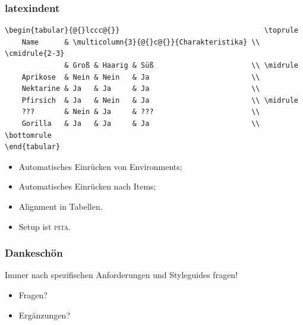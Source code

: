 \documentclass[handout]{beamer}
\makeatletter
\def\beamer@writeslidentry@miniframesoff{%
    \expandafter\beamer@ifempty\expandafter{\beamer@framestartpage}{}%
    {%
        \clearpage\beamer@notesactions%
    }
}
\newcommand*{\miniframesoff}{\let\beamer@writeslidentry=\beamer@writeslidentry@miniframesoff}
\makeatother
\begin{document}
\begin{frame}[fragile]
    \frametitle{latexindent}
    \begin{lstlisting}[basicstyle=\ttfamily\scriptsize]
\begin{tabular}{@{}lccc@{}}                                  \toprule
    Name      & \multicolumn{3}{@{}c@{}}{Charakteristika} \\ \cmidrule{2-3}
              & Groß & Haarig & Süß                       \\ \midrule
    Aprikose  & Nein & Nein   & Ja                        \\
    Nektarine & Ja   & Ja     & Ja                        \\
    Pfirsich  & Ja   & Nein   & Ja                        \\ \midrule
    ???       & Nein & Ja     & ???                       \\
    Gorilla   & Ja   & Ja     & Ja                        \\ \bottomrule
\end{tabular}
    \end{lstlisting}
    \begin{itemize}
        \item Automatisches Einrücken von Environments;
        \item Automatisches Einrücken nach Items;
        \item Alignment in Tabellen.
        \item Setup ist \textsc{pita}.
    \end{itemize}
\end{frame}

\appendix
\miniframesoff
\begin{frame}[fragile]
    \frametitle{Dankeschön}
    Immer nach spezifischen Anforderungen und Styleguides fragen!\\[4ex]

    \begin{itemize}
        \item Fragen?
        \item Ergänzungen?
    \end{itemize}

\end{frame}

\newcommand{\roundpanda}[2][0ex]{%
    \begin{tikzpicture}
        \begin{scope}
            \clip [rounded corners=#1] (0,0) rectangle coordinate (centerpoint) (.24\linewidth,.24\linewidth);
            \node [inner sep=0pt] at (centerpoint) {\texttt{[image: images/pandas/\#2]}};
        \end{scope}
    \end{tikzpicture}%
}
\end{document}
